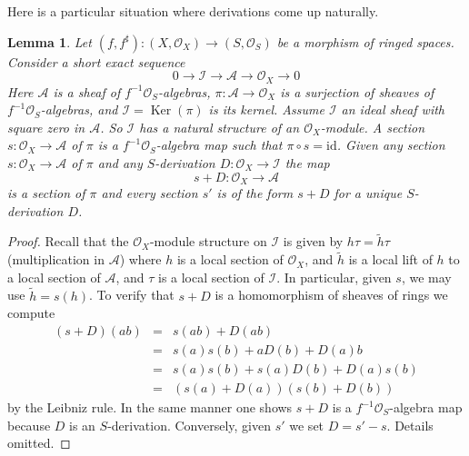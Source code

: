 \documentclass{stacks-project}
\theoremstyle{plain}
\newtheorem{lemma}[subsection]{Lemma}
\theoremstyle{definition}
\theoremstyle{remark}
\numberwithin{equation}{subsection}
\def\Ker{\mathop{\mathrm{Ker}}}
\begin{document}
\noindent
Here is a particular situation where derivations come up
naturally.

\begin{lemma}
\label{lemma-double-structure-gives-derivation}
Let $(f, f^\sharp) : (X, \mathcal{O}_X) \to (S, \mathcal{O}_S)$
be a morphism of ringed spaces. Consider a short exact sequence
$$
0 \to \mathcal{I} \to \mathcal{A} \to \mathcal{O}_X \to 0
$$
Here $\mathcal{A}$ is a sheaf of $f^{-1}\mathcal{O}_S$-algebras,
$\pi : \mathcal{A} \to \mathcal{O}_X$ is a surjection
of sheaves of $f^{-1}\mathcal{O}_S$-algebras, and
$\mathcal{I} = \Ker(\pi)$ is its kernel. Assume $\mathcal{I}$ an ideal
sheaf with square zero in $\mathcal{A}$. So $\mathcal{I}$
has a natural structure of an $\mathcal{O}_X$-module.
A section $s : \mathcal{O}_X \to \mathcal{A}$ of $\pi$
is a $f^{-1}\mathcal{O}_S$-algebra map such that $\pi \circ s = \text{id}$.
Given any section $s : \mathcal{O}_X \to \mathcal{A}$
of $\pi$ and any $S$-derivation $D : \mathcal{O}_X \to \mathcal{I}$
the map
$$
s + D : \mathcal{O}_X \to \mathcal{A}
$$
is a section of $\pi$ and every section $s'$ is of the form $s + D$
for a unique $S$-derivation $D$.
\end{lemma}

\begin{proof}
Recall that the $\mathcal{O}_X$-module structure on $\mathcal{I}$
is given by $h \tau = \tilde h \tau$ (multiplication in $\mathcal{A}$)
where $h$ is a local section of $\mathcal{O}_X$, and
$\tilde h$ is a local lift of $h$ to a local
section of $\mathcal{A}$, and $\tau$ is a local section of $\mathcal{I}$.
In particular, given $s$, we may use $\tilde h = s(h)$.
To verify that $s + D$ is a homomorphism of sheaves of rings we
compute
\begin{eqnarray*}
(s + D)(ab) & = & s(ab) + D(ab) \\
& = & s(a)s(b) + aD(b) + D(a)b \\
& = & s(a) s(b) + s(a)D(b) + D(a)s(b) \\
& = & (s(a) + D(a))(s(b) + D(b))
\end{eqnarray*}
by the Leibniz rule. In the same manner one shows
$s + D$ is a $f^{-1}\mathcal{O}_S$-algebra
map because $D$ is an $S$-derivation. Conversely, given $s'$ we set
$D = s' - s$. Details omitted.
\end{proof}
\end{document}
